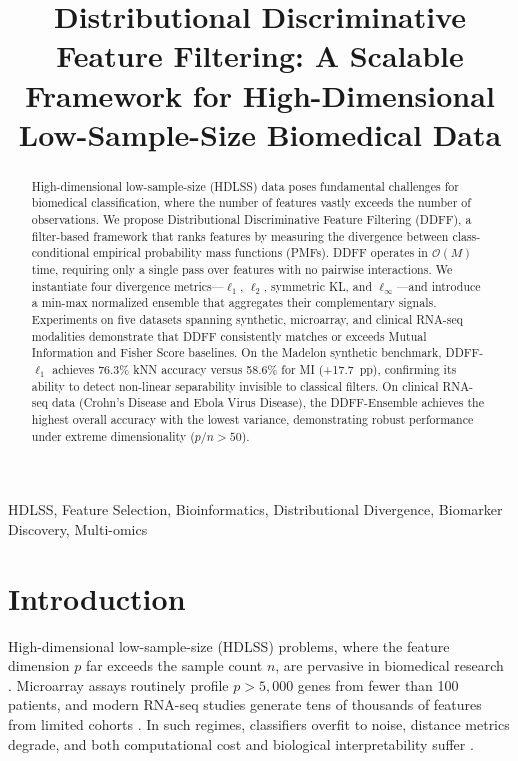 \documentclass[conference]{IEEEtran}
\begin{document}
\title{Distributional Discriminative Feature Filtering: A Scalable Framework for High-Dimensional Low-Sample-Size Biomedical Data
}


\maketitle

\begin{abstract}
High-dimensional low-sample-size (HDLSS) data poses fundamental challenges for biomedical classification, where the number of features vastly exceeds the number of observations. We propose Distributional Discriminative Feature Filtering (DDFF), a filter-based framework that ranks features by measuring the divergence between class-conditional empirical probability mass functions (PMFs). DDFF operates in $\mathcal{O}(M)$ time, requiring only a single pass over features with no pairwise interactions. We instantiate four divergence metrics---$\ell_1$, $\ell_2$, symmetric KL, and $\ell_\infty$---and introduce a min-max normalized ensemble that aggregates their complementary signals. Experiments on five datasets spanning synthetic, microarray, and clinical RNA-seq modalities demonstrate that DDFF consistently matches or exceeds Mutual Information and Fisher Score baselines. On the Madelon synthetic benchmark, DDFF-$\ell_1$ achieves 76.3\% kNN accuracy versus 58.6\% for MI (+17.7~pp), confirming its ability to detect non-linear separability invisible to classical filters. On clinical RNA-seq data (Crohn's Disease and Ebola Virus Disease), the DDFF-Ensemble achieves the highest overall accuracy with the lowest variance, demonstrating robust performance under extreme dimensionality ($p/n > 50$).

\end{abstract}

\begin{IEEEkeywords}
HDLSS, Feature Selection, Bioinformatics, Distributional Divergence, Biomarker Discovery, Multi-omics
\end{IEEEkeywords}
\section{Introduction}
\label{sec:intro}

High-dimensional low-sample-size (HDLSS) problems, where the feature dimension $p$ far exceeds the sample count $n$, are pervasive in biomedical research \cite{Golugula2011EvaluatingFSE}. Microarray assays routinely profile $p > 5{,}000$ genes from fewer than 100 patients, and modern RNA-seq studies generate tens of thousands of features from limited cohorts \cite{Liu2017DeepNNA}. In such regimes, classifiers overfit to noise, distance metrics degrade, and both computational cost and biological interpretability suffer \cite{Yin2019PopulationGuidedLML, Cavalheiro2023RandomFKQ}.
\end{document}
